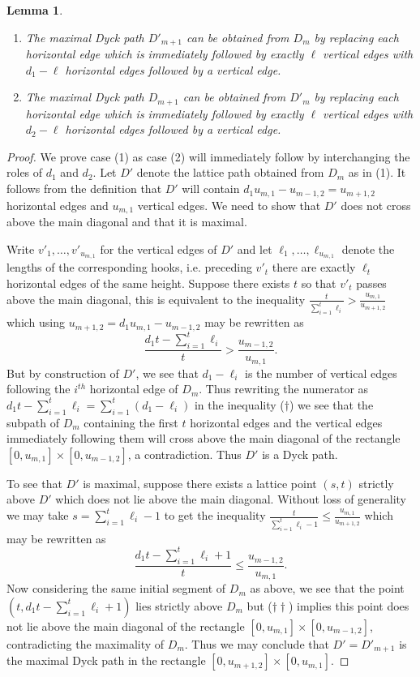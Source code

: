 \documentclass{amsart}
\newtheorem{lemma}[theorem]{Lemma}
\begin{document}
\begin{lemma}\label{le:Dyck path recursion}\mbox{}
  \begin{enumerate}
    \item The maximal Dyck path $D'_{m+1}$ can be obtained from $D_m$ by replacing each horizontal edge which is immediately followed by exactly $\ell$ vertical edges with $d_1-\ell$ horizontal edges followed by a vertical edge.
    \item The maximal Dyck path $D_{m+1}$ can be obtained from $D'_m$ by replacing each horizontal edge which is immediately followed by exactly $\ell$ vertical edges with $d_2-\ell$ horizontal edges followed by a vertical edge.
  \end{enumerate}
\end{lemma}
\begin{proof}
  We prove case (1) as case (2) will immediately follow by interchanging the roles of $d_1$ and $d_2$.  Let $D'$ denote the lattice path obtained from $D_m$ as in (1).  It follows from the definition that $D'$ will contain $d_1u_{m,1}-u_{m-1,2}=u_{m+1,2}$ horizontal edges and $u_{m,1}$ vertical edges.  We need to show that $D'$ does not cross above the main diagonal and that it is maximal.  

  Write $v'_1,\ldots,v'_{u_{m,1}}$ for the vertical edges of $D'$ and let $\ell_1,\ldots,\ell_{u_{m,1}}$ denote the lengths of the corresponding hooks, i.e. preceding $v'_t$ there are exactly $\ell_t$ horizontal edges of the same height.  Suppose there exists $t$ so that $v'_t$ passes above the main diagonal, this is equivalent to the inequality $\frac{t}{\sum\limits_{i=1}^t\ell_i}>\frac{u_{m,1}}{u_{m+1,2}}$ which using $u_{m+1,2}=d_1u_{m,1}-u_{m-1,2}$ may be rewritten as 
  \[\tag{$\dagger$}\frac{d_1t-\sum\limits_{i=1}^t\ell_i}{t}>\frac{u_{m-1,2}}{u_{m,1}}.\]
  But by construction of $D'$, we see that $d_1-\ell_i$ is the number of vertical edges following the $i^{th}$ horizontal edge of $D_m$.  Thus rewriting the numerator as $d_1t-\sum\limits_{i=1}^t\ell_i=\sum\limits_{i=1}^t(d_1-\ell_i)$ in the inequality ($\dagger$) we see that the subpath of $D_m$ containing the first $t$ horizontal edges and the vertical edges immediately following them will cross above the main diagonal of the rectangle $[0,u_{m,1}]\times[0,u_{m-1,2}]$, a contradiction.  Thus $D'$ is a Dyck path.

  To see that $D'$ is maximal, suppose there exists a lattice point $(s,t)$ strictly above $D'$ which does not lie above the main diagonal.  Without loss of generality we may take $s=\sum\limits_{i=1}^t\ell_i-1$ to get the inequality $\frac{t}{\sum\limits_{i=1}^t\ell_i-1}\le\frac{u_{m,1}}{u_{m+1,2}}$ which may be rewritten as
  \[\tag{$\dagger\dagger$}\frac{d_1t-\sum\limits_{i=1}^t\ell_i+1}{t}\le\frac{u_{m-1,2}}{u_{m,1}}.\]
  Now considering the same initial segment of $D_m$ as above, we see that the point $(t,d_1t-\sum\limits_{i=1}^t\ell_i+1)$ lies strictly above $D_m$ but ($\dagger\dagger$) implies this point does not lie above the main diagonal of the rectangle $[0,u_{m,1}]\times[0,u_{m-1,2}]$, contradicting the maximality of $D_m$.  Thus we may conclude that $D'=D'_{m+1}$ is the maximal Dyck path in the rectangle $[0,u_{m+1,2}]\times[0,u_{m,1}]$.
\end{proof}
\end{document}
